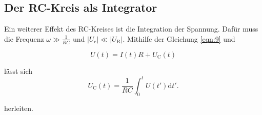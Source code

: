 \subsection{Der RC-Kreis als Integrator}
Ein weiterer Effekt des RC-Kreises ist die Integration der Spannung. Dafür  muss die Frequenz $\omega \gg \frac{1}{RC}$ und 
$|U_{\text{c}}| \ll | U_{\text{R}}|$.
Mithilfe der Gleichung \ref{eqn:9} und 

\begin{equation*}
    U(t) = I(t) R + U_{\text{C}}(t)
\end{equation*}

\noindent lässt sich 
\begin{equation*}
    U_{\text{C}}(t) = \frac{1}{RC} \int_0^t U(t')\text{d}t' .
\end{equation*}

\noindent herleiten.